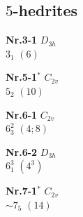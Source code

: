 \documentclass[12pt]{article}
\begin{document}
\subsection{$5$-hedrites}\label{subsection-5-hedrites}
{\small
\setlength{\unitlength}{1cm}
\begin{minipage}[t]{3.5cm}
\centering
\epsfxsize=2.5cm
\par
{{\bf Nr.3-1} \quad $D_{3h}$\\ $3_{1}$ \quad $(6)$\\\vspace{3mm} }
\end{minipage}
\setlength{\unitlength}{1cm}
\begin{minipage}[t]{3.5cm}
\centering
\epsfxsize=2.5cm
\par
{{\bf Nr.5-1${}^*$} \quad $C_{2v}$\\ $5_{2}$ \quad $(10)$\\\vspace{3mm} }
\end{minipage}
\setlength{\unitlength}{1cm}
\begin{minipage}[t]{3.5cm}
\centering
\epsfxsize=2.5cm
\par
{{\bf Nr.6-1} \quad $C_{2v}$\\ $6^2_{3}$ \quad $(4;8)$\\\vspace{3mm} }
\end{minipage}
\setlength{\unitlength}{1cm}
\begin{minipage}[t]{3.5cm}
\centering
\epsfxsize=2.5cm
\par
{{\bf Nr.6-2} \quad $D_{3h}$\\ $6^3_{1}$ \quad $(4^3)$\\\vspace{3mm} }
\end{minipage}
\setlength{\unitlength}{1cm}
\begin{minipage}[t]{3.5cm}
\centering
\epsfxsize=2.5cm
\par
{{\bf Nr.7-1${}^*$} \quad $C_{2v}$\\ $\sim 7_{5}$ \quad $(14)$\\\vspace{3mm} }
\end{minipage}
\setlength{\unitlength}{1cm}
\begin{minipage}[t]{3.5cm}
\centering
\epsfxsize=2.5cm
\par

\end{minipage}}
\end{document}
